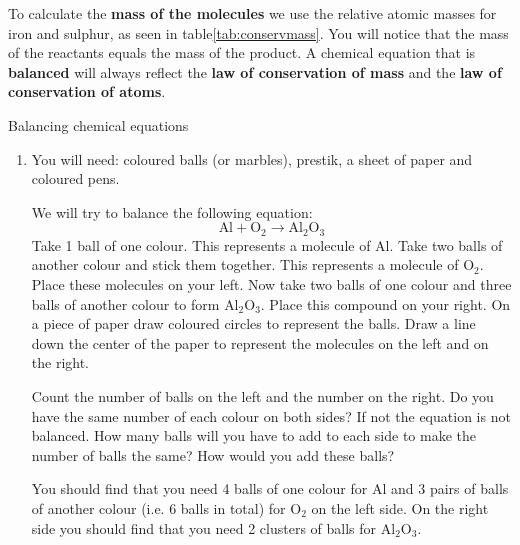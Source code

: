 To calculate the \textbf{mass of the molecules} we use the relative atomic masses for iron and sulphur, as seen in table\ref{tab:conservmass}. You will notice that the mass of the reactants equals the mass of the product. A chemical equation that is \textbf{balanced} will always reflect the \textbf{law of conservation of mass} and the \textbf{law of conservation of atoms}.  
      \label{m38726*eip-619}
            \begin{activity}{Balancing chemical equations}
            \nopagebreak
\begin{enumerate}[noitemsep, label=\textbf{\arabic*}]
\item            \label{m38726*eip-695}You will need: coloured balls (or marbles), prestik, a sheet of paper and coloured pens.
\par 
\label{m38726*eip-69823}We will try to balance the following equation:
\label{m38726*eid0342}\nopagebreak\noindent{}
    \begin{equation*}
    \text{Al}+{\text{O}}_{2}\to {\text{Al}}_{2}{\text{O}}_{3}
      \end{equation*}
Take 1 ball of one colour. This represents a molecule of $\text{Al}$. Take two balls of another colour and stick them together. This represents a molecule of ${\text{O}}_{2}$. Place these molecules on your left. Now take two balls of one colour and three balls of another colour to form ${\text{Al}}_{2}{\text{O}}_{3}$. Place this compound on your right. On a piece of paper draw coloured circles to represent the balls. Draw a line down the center of the paper to represent the molecules on the left and on the right. 
\par 
\label{m38726*id23534}
Count the number of balls on the left and the number on the right. Do you have the same number of each colour on both sides? If not the equation is not balanced. How many balls will you have to add to each side to make the number of balls the same? How would you add these balls?
\par
\label{m38726*id09873432}You should find that you need 4 balls of one colour for $\text{Al}$ and 3 pairs of balls of another colour (i.e. 6 balls in total) for ${\text{O}}_{2}$ on the left side. On the right side you should find that you need 2 clusters of balls for ${\text{Al}}_{2}{\text{O}}_{3}$.

\end{enumerate}
\end{activity}
